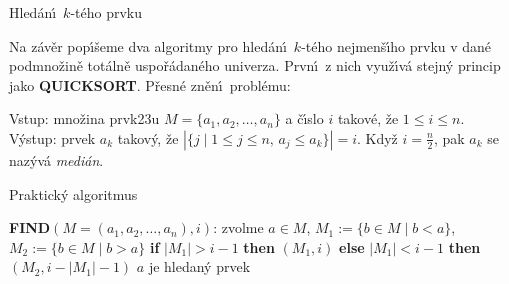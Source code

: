\subhead
Hled\'an\'\i\ $k$-t\'eho prvku
\endsubhead
\smallskip

\flushpar Na z\'av\v er pop\'\i\v seme dva algoritmy pro hled\'an\'\i\ $
k$-t\'eho 
nejmen\v s\'\i\-ho prvku v dan\'e podmno\v zin\v e tot\'aln\v e 
uspo\v r\'adan\'e\-ho univerza. Prv\-n\'\i\ z nich vyu\v z\'\i v\'a  
stejn\'y princip jako {\bf QUICKSORT}. P\v res\-n\'e zn\v e\-n\'\i\ 
probl\'emu:
\medskip

\flushpar Vstup: mno\v zina prvk\accent23u $M=\{a_1,a_2,\dots,a_n
\}$ a \v c\'\i slo $i$ takov\'e, 
\v ze $1\le i\le n$.\newline 
V\'ystup: prvek $a_k$ takov\'y, \v ze 
$|\{j\mid 1\le j\le n,\,a_j\le a_k\}|=i$.\newline 
Kdy\v z $i=\frac n2$, pak $a_k$ se naz\'yv\'a \emph{medi\'an}.
\medskip

\subhead
Praktick\'y algoritmus
\endsubhead
\medskip

{\bf FIND}$(M=(a_1,a_2,\dots,a_n),i)$:\newline 
zvolme $a\in M$, $M_1:=\{b\in M\mid b<a\}$, 
$M_2:=\{b\in M\mid b>a\}$\newline 
{\bf if} $|M_1|>i-1$ {\bf then}\newline 
\phantom{---}{\bf FIND}$(M_1,i)$\newline 
{\bf else}\newline 
\phantom{---}{\bf if} $|M_1|<i-1$ {\bf then}\newline 
\phantom{------}{\bf FIND}$(M_2,i-|M_1|-1)$\newline 
\phantom{---}{\bf else}\newline 
\phantom{------}$a$ je hledan\'y prvek\newline 
\phantom{---}{\bf endif\newline 
endif}
\bigskip

